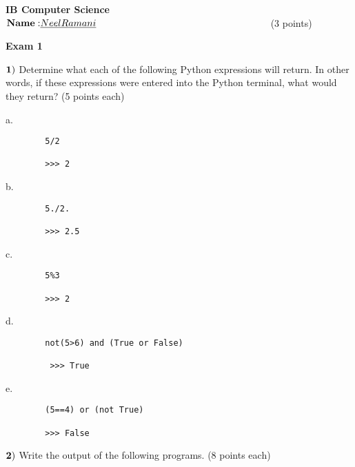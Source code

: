 \documentclass{article}
\begin{document}

\doublespacing
\textbf{IB Computer Science }                        %
 \hfill                             %
$ {\bf Name: } \underline {Neel Ramani}{\hspace{2.5in}}$(3 points)

\begin{centering}
\vspace{1cm}
\textbf{Exam 1}\\
\end{centering}
\vspace{1cm}
 
$\bf{1)}$ Determine what each of the following Python expressions will return.  In other words, if these expressions were entered into the Python terminal, what would they return?
(5 points each)

\vspace{1cm}
  
 a.  
 \begin{verbatim}
 		5/2
		
		>>> 2
 \end{verbatim}
 
 b.   \begin{verbatim}
 		5./2.
		
		>>> 2.5
 \end{verbatim}
  \vspace{1cm}
 
 c.  
  \begin{verbatim}
 		5%3
		
		>>> 2
 \end{verbatim}
 \vspace{1cm}
  
 d. 
  \begin{verbatim}
 		not(5>6) and (True or False) 
		
	 	 >>> True
 \end{verbatim}
 \vspace{1cm}
 
 e. 
  \begin{verbatim}
 		(5==4) or (not True) 
		
		>>> False
 \end{verbatim}
 \vspace{1cm}

  \newpage
  
 $\bf{2)}$ Write the output of the following programs. (8 points each)
 
 \vspace{1cm}
\end{document}
